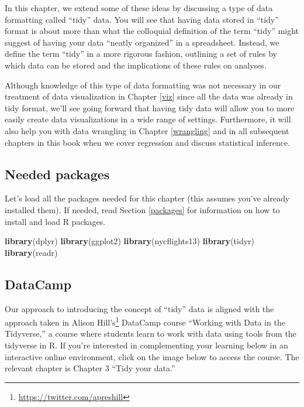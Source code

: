 \documentclass[12pt,]{krantz}
\makeatletter
\newenvironment{Shaded}{\begin{snugshade}}{\end{snugshade}}
\newcommand{\KeywordTok}[1]{\textcolor[rgb]{0.27,0.27,0.27}{\textbf{#1}}}
\newcommand{\NormalTok}[1]{#1}
\renewcommand{\href}[2]{#2\footnote{\url{#1}}}
\newenvironment{kframe}{%
\medskip{}
\setlength{\fboxsep}{.8em}
 \def\at@end@of@kframe{}%
 \ifinner\ifhmode%
  \def\at@end@of@kframe{\end{minipage}}%
  \begin{minipage}{\columnwidth}%
 \fi\fi%
 \def\FrameCommand##1{\hskip\@totalleftmargin \hskip-\fboxsep
 \colorbox{shadecolor}{##1}\hskip-\fboxsep
     \hskip-\linewidth \hskip-\@totalleftmargin \hskip\columnwidth}%
 \MakeFramed {\advance\hsize-\width
   \@totalleftmargin\z@ \linewidth\hsize
   \@setminipage}}%
 {\par\unskip\endMakeFramed%
 \at@end@of@kframe}
\renewenvironment{Shaded}{\begin{kframe}}{\end{kframe}}
\theoremstyle{definition}
\theoremstyle{definition}
\theoremstyle{definition}
\theoremstyle{remark}
\makeatother
\begin{document}
In this chapter, we extend some of these ideas by discussing a type of
data formatting called ``tidy'' data. You will see that having data
stored in ``tidy'' format is about more than what the colloquial
definition of the term ``tidy'' might suggest of having your data
``neatly organized'' in a spreadsheet. Instead, we define the term
``tidy'' in a more rigorous fashion, outlining a set of rules by which
data can be stored and the implications of these rules on analyses.

Although knowledge of this type of data formatting was not necessary in
our treatment of data visualization in Chapter \ref{viz} since all the
data was already in tidy format, we'll see going forward that having
tidy data will allow you to more easily create data visualizations in a
wide range of settings. Furthermore, it will also help you with data
wrangling in Chapter \ref{wrangling} and in all subsequent chapters in
this book when we cover regression and discuss statistical inference.

\subsection*{Needed packages}\label{needed-packages-1}


Let's load all the packages needed for this chapter (this assumes you've
already installed them). If needed, read Section \ref{packages} for
information on how to install and load R packages.

\begin{Shaded}
\begin{Highlighting}[]
\KeywordTok{library}\NormalTok{(dplyr)}
\KeywordTok{library}\NormalTok{(ggplot2)}
\KeywordTok{library}\NormalTok{(nycflights13)}
\KeywordTok{library}\NormalTok{(tidyr)}
\KeywordTok{library}\NormalTok{(readr)}
\end{Highlighting}
\end{Shaded}

\subsection*{DataCamp}\label{datacamp-1}


Our approach to introducing the concept of ``tidy'' data is aligned with
the approach taken in \href{https://twitter.com/apreshill}{Alison
Hill's} DataCamp course ``Working with Data in the Tidyverse,'' a course
where students learn to work with data using tools from the tidyverse in
R. If you're interested in complementing your learning below in an
interactive online environment, click on the image below to access the
course. The relevant chapter is Chapter 3 ``Tidy your data.''
\end{document}
